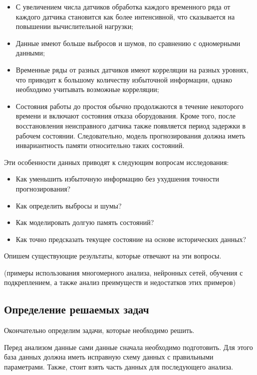 \begin{itemize}
    \item С увеличением числа датчиков обработка каждого 
    временного ряда от каждого датчика становится как более интенсивной, что сказывается на повышении вычислительной нагрузки;
    \item Данные имеют больше выбросов и шумов, по сравнению с одномерными данными;
    \item Временные ряды от разных датчиков имеют корреляции на разных уровнях, 
    что приводит к большому количеству избыточной информации, однако необходимо учитывать возможные корреляции;
    \item Состояния работы до простоя обычно продолжаются в течение некоторого времени и включают состояния отказа оборудования. 
    Кроме того, после восстановления неисправного датчика также появляется период задержки в рабочем состоянии. 
    Следовательно, модель прогнозирования должна иметь инвариантность памяти относительно таких состояний. 
\end{itemize}


Эти особенности данных приводят к следующим вопросам исследования:

\begin{itemize}
    \item Как уменьшить избыточную информацию без ухудшения точности прогнозирования?
    \item Как определить выбросы и шумы?
    \item Как моделировать долгую память состояний?
    \item Как точно предсказать текущее состояние на основе исторических данных?
\end{itemize}

Опишем существующие результаты, которые отвечают на эти вопросы.

(примеры использования многомерного анализа, нейронных сетей, обучения с подкреплением, а также анализ преимуществ и недостатков этих примеров)

\subsection{Определение решаемых задач}

Окончательно определим задачи, которые необходимо решить.

Перед анализом данные сами данные сначала необходимо подготовить.
Для этого база данных должна иметь исправную схему данных с правильными параметрами.
Также, стоит взять часть данных для последующего анализа.

